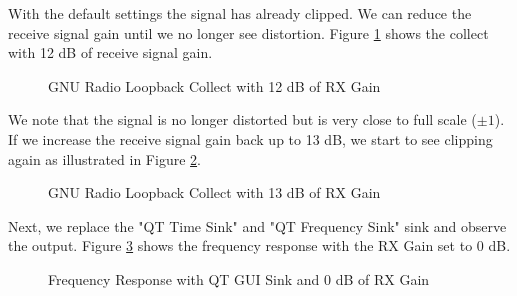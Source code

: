 \documentclass{article}
\begin{document}
With the default settings the signal has already clipped. We can reduce the receive signal gain until we no longer see distortion. Figure \ref{fig::gnu_radio_loopback_rx_gain_12dB} shows the collect with 12 dB of receive signal gain.

\begin{figure}[H]
	\centerline{}
	\caption{GNU Radio Loopback Collect with 12 dB of RX Gain}
	\label{fig::gnu_radio_loopback_rx_gain_12dB}
\end{figure}

We note that the signal is no longer distorted but is very close to full scale ($\pm 1$). If we increase the receive signal gain back up to 13 dB, we start to see clipping again as illustrated in Figure \ref{fig::gnu_radio_loopback_rx_gain_13dB}.

\begin{figure}[H]
	\centerline{}
	\caption{GNU Radio Loopback Collect with 13 dB of RX Gain}
	\label{fig::gnu_radio_loopback_rx_gain_13dB}
\end{figure}

Next, we replace the "QT Time Sink" and "QT Frequency Sink" sink and observe the output. Figure \ref{fig::gnu_radio_loopback_qt_gui_sink} shows the frequency response with the RX Gain set to 0 dB.

\begin{figure}[H]
	\centerline{}
	\caption{Frequency Response with QT GUI Sink and 0 dB of RX Gain}
	\label{fig::gnu_radio_loopback_qt_gui_sink}
\end{figure}
\end{document}
